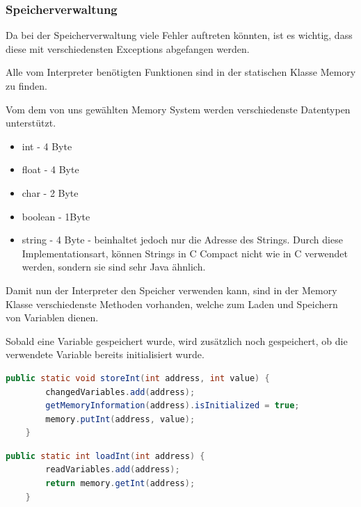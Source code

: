 \subsubsection{Speicherverwaltung}
Da bei der Speicherverwaltung viele Fehler auftreten könnten, ist es wichtig, dass diese mit verschiedensten Exceptions abgefangen werden.

Alle vom Interpreter benötigten Funktionen sind in der statischen Klasse Memory zu finden. 

Vom dem von uns gewählten Memory System werden verschiedenste Datentypen unterstützt.
\begin{itemize}
 \item int - 4 Byte
 \item float - 4 Byte
 \item char - 2 Byte 
 \item boolean - 1Byte
 \item string - 4 Byte - beinhaltet jedoch nur die Adresse des Strings. Durch diese Implementationsart, können Strings in C Compact nicht wie in C verwendet werden, sondern sie sind sehr Java ähnlich.
\end{itemize}
Damit nun der Interpreter den Speicher verwenden kann, sind in der Memory Klasse verschiedenste Methoden vorhanden, welche zum Laden und Speichern von Variablen dienen.

Sobald eine Variable gespeichert wurde, wird zusätzlich noch gespeichert, ob die verwendete Variable bereits initialisiert wurde.
\begin{lstlisting}[language=JAVA]
	public static void storeInt(int address, int value) {
		changedVariables.add(address);
		getMemoryInformation(address).isInitialized = true;
		memory.putInt(address, value);
	}
\end{lstlisting}

\begin{lstlisting}[language=JAVA]
	public static int loadInt(int address) {
		readVariables.add(address);
		return memory.getInt(address);
	}
\end{lstlisting}

